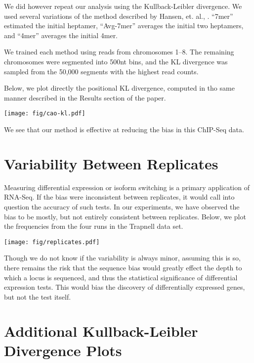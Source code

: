\documentclass[letterpaper]{article}
\begin{document}
We did however repeat our analysis using the Kullback-Leibler divergence.
We used several variations of the method described by Hansen, et. al.,
\cite{Hansen2010}. ``7mer'' estimated the initial heptamer, ``Avg-7mer''
averages the initial two heptamers, and ``4mer'' averages the initial 4mer.

We trained each method using reads from chromosomes 1--8. The
remaining chromosomes were segmented into 500nt bins, and the KL divergence was
sampled from the 50,000 segments with the highest read counts.

Below, we plot directly the positional KL divergence, computed in tho same
manner described in the Results section of the paper.

\begin{center}
\texttt{[image: fig/cao-kl.pdf]}
\end{center}

We see that our method is effective at reducing the bias in this ChIP-Seq data.



\section{Variability Between Replicates}

Measuring differential expression or isoform switching is a primary application of
RNA-Seq. If the bias were inconsistent between replicates, it would call into
question the accuracy of such tests. In our experiments, we have observed the
bias to be mostly, but not entirely consistent between replicates. Below, we
plot the frequencies from the four runs in the Trapnell data set.

\begin{center}
\texttt{[image: fig/replicates.pdf]}
\end{center}

Though we do not know if the variability is always minor, assuming this is so,
there remains the risk that the sequence bias would greatly effect the depth to
which a locus is sequenced, and thus the statistical significance of
differential expression tests. This would bias the discovery of differentially
expressed genes, but not the test itself.



\section{Additional Kullback-Leibler Divergence Plots}
\end{document}
